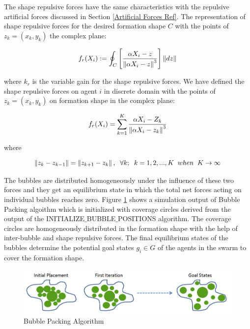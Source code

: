 The shape repulsive forces have the same characteristics with the repulsive artificial forces discussed in Section \ref{Artificial Forces Ref}. The representation of shape repulsive forces for the desired formation shape $C$ with the points of  $z_k = (x_k,y_k)$ the complex plane:
	
\begin{equation} \label{buble_repulsive}
f_r(X_i) := \oint_C \left[\frac{\alpha X_i - z}{\left\lVert\alpha X_i - z\right\rVert^3}\right] \left\lVert dz\right\rVert
\end{equation}

where $k_r$ is the variable gain for the shape repulsive forces. We have defined the shape repulsive forces on agent $i$ in discrete domain with the points of  $z_k = (x_k,y_k)$ on formation shape in the complex plane:

\begin{equation}
f_r(X_i) = \sum_{k=1}^{K} \frac{\alpha X_i - Z_k}{\left\lVert\alpha X_i - z_k\right\rVert^3}
\end{equation}
				
where

\begin{equation}
\left\lVert z_k - z_{k-1}\right\rVert = \left\lVert z_{k+1} - z_k\right\rVert, \hspace{0.2cm}  \forall k ;  \hspace{0.2cm} k=1,2,...,K \hspace{0.2cm} when  \hspace{0.2cm} K \to\infty					
\end{equation}
						

	
The bubbles are distributed homogeneously under the influence of these two forces and they get an equilibrium state in which the total net forces acting on individual bubbles reaches zero. Figure \ref{buble_ornek} shows a simulation output of Bubble Packing algoithm which is initialized with coverage circles derived from the output of the INITIALIZE$\_$BUBBLE$\_$POSITIONS algorithm. The coverage circles are homogeneously distributed in the formation shape with the help of inter-bubble and shape repulsive forces. The final equilibrium states of the bubbles determine the potential goal states $g_i \in G$  of the agents in the swarm to cover the formation shape.

\begin{figure}[H]
\caption{Bubble Packing Algorithm} \label{buble_ornek}
\centering
\includegraphics[scale = 0.62]{bubble_packing2}
\end{figure}


